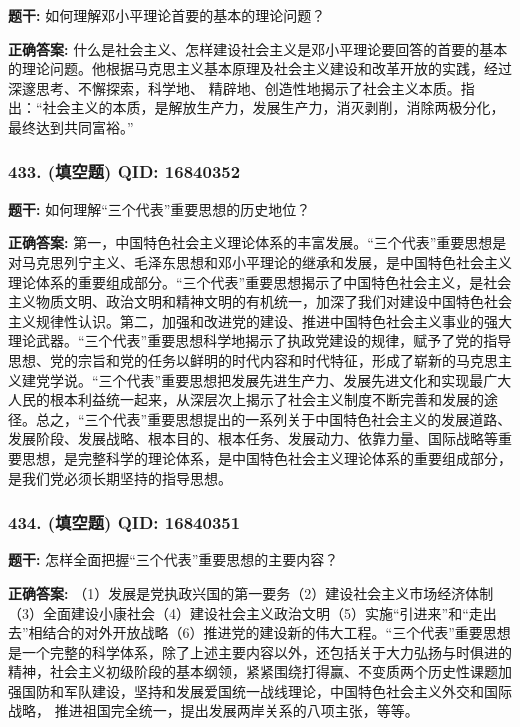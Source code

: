 \documentclass[12pt,UTF8]{ctexart}
\begin{document}
\textbf{题干:}
如何理解邓小平理论首要的基本的理论问题？

\textbf{正确答案:}
什么是社会主义、怎样建设社会主义是邓小平理论要回答的首要的基本的理论问题。他根据马克思主义基本原理及社会主义建设和改革开放的实践，经过深邃思考、不懈探索，科学地、 精辟地、创造性地揭示了社会主义本质。指出：“社会主义的本质，是解放生产力，发展生产力，消灭剥削，消除两极分化， 最终达到共同富裕。”

\vspace{0.3em}\hrulefill\vspace{0.7em}

\subsubsection*{433. (填空题) \small QID: 16840352}

\textbf{题干:}
如何理解“三个代表”重要思想的历史地位？

\textbf{正确答案:}
第一，中国特色社会主义理论体系的丰富发展。“三个代表”重要思想是对马克思列宁主义、毛泽东思想和邓小平理论的继承和发展，是中国特色社会主义理论体系的重要组成部分。“三个代表”重要思想揭示了中国特色社会主义，是社会主义物质文明、政治文明和精神文明的有机统一，加深了我们对建设中国特色社会主义规律性认识。第二，加强和改进党的建设、推进中国特色社会主义事业的强大理论武器。“三个代表”重要思想科学地揭示了执政党建设的规律，赋予了党的指导思想、党的宗旨和党的任务以鲜明的时代内容和时代特征，形成了崭新的马克思主义建党学说。“三个代表”重要思想把发展先进生产力、发展先进文化和实现最广大人民的根本利益统一起来，从深层次上揭示了社会主义制度不断完善和发展的途径。总之，“三个代表”重要思想提出的一系列关于中国特色社会主义的发展道路、发展阶段、发展战略、根本目的、根本任务、发展动力、依靠力量、国际战略等重要思想，是完整科学的理论体系，是中国特色社会主义理论体系的重要组成部分，是我们党必须长期坚持的指导思想。

\vspace{0.3em}\hrulefill\vspace{0.7em}

\subsubsection*{434. (填空题) \small QID: 16840351}

\textbf{题干:}
怎样全面把握“三个代表”重要思想的主要内容？

\textbf{正确答案:}
（1）发展是党执政兴国的第一要务（2）建设社会主义市场经济体制（3）全面建设小康社会（4）建设社会主义政治文明（5）实施“引进来”和“走出去”相结合的对外开放战略（6）推进党的建设新的伟大工程。“三个代表”重要思想是一个完整的科学体系，除了上述主要内容以外，还包括关于大力弘扬与时俱进的精神，社会主义初级阶段的基本纲领，紧紧围绕打得赢、不变质两个历史性课题加强国防和军队建设，坚持和发展爱国统一战线理论，中国特色社会主义外交和国际战略， 推进祖国完全统一，提出发展两岸关系的八项主张，等等。
\end{document}
